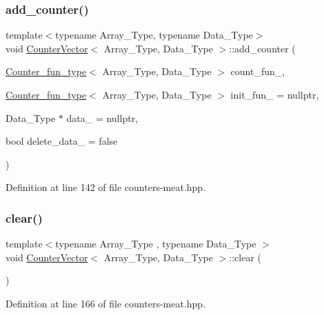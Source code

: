 \subsubsection{\texorpdfstring{add\+\_\+counter()}{add\_counter()}\hspace{0.1cm}{\footnotesize\ttfamily [3/3]}}
{\footnotesize\ttfamily template$<$typename Array\+\_\+\+Type, typename Data\+\_\+\+Type$>$ \\
void \hyperlink{class_counter_vector}{Counter\+Vector}$<$ Array\+\_\+\+Type, Data\+\_\+\+Type $>$\+::add\+\_\+counter (\begin{DoxyParamCaption}\item[{\hyperlink{typedefs_8hpp_ac0160f52f564dea3ac033b374cffbfe7}{Counter\+\_\+fun\+\_\+type}$<$ Array\+\_\+\+Type, Data\+\_\+\+Type $>$}]{count\+\_\+fun\+\_\+,  }\item[{\hyperlink{typedefs_8hpp_ac0160f52f564dea3ac033b374cffbfe7}{Counter\+\_\+fun\+\_\+type}$<$ Array\+\_\+\+Type, Data\+\_\+\+Type $>$}]{init\+\_\+fun\+\_\+ = {\ttfamily nullptr},  }\item[{Data\+\_\+\+Type $\ast$}]{data\+\_\+ = {\ttfamily nullptr},  }\item[{bool}]{delete\+\_\+data\+\_\+ = {\ttfamily false} }\end{DoxyParamCaption})\hspace{0.3cm}{\ttfamily [inline]}}



Definition at line 142 of file counters-\/meat.\+hpp.

\mbox{\label{class_counter_vector_acce75748f917e3a7898d49a23df996e7}} 
\subsubsection{\texorpdfstring{clear()}{clear()}}
{\footnotesize\ttfamily template$<$typename Array\+\_\+\+Type , typename Data\+\_\+\+Type $>$ \\
void \hyperlink{class_counter_vector}{Counter\+Vector}$<$ Array\+\_\+\+Type, Data\+\_\+\+Type $>$\+::clear (\begin{DoxyParamCaption}{ }\end{DoxyParamCaption})\hspace{0.3cm}{\ttfamily [inline]}}



Definition at line 166 of file counters-\/meat.\+hpp.

